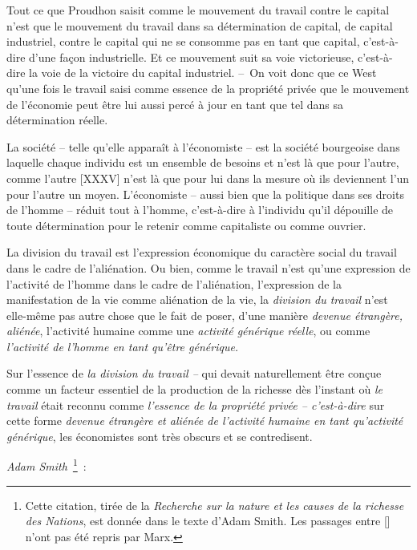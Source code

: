 \documentclass[french,twoside]{book} %
\begin{document}
Tout ce que Proudhon saisit comme le mouvement du travail contre le capital n’est que le mouvement du travail dans sa détermination de capital, de capital industriel, contre le capital qui ne se consomme pas en tant que capital, c’est-à-dire d’une façon industrielle. Et ce mouvement suit sa voie victorieuse, c’est-à-dire la voie de la victoire du capital industriel. – On voit donc que ce West qu’une fois le travail saisi comme essence de la propriété privée que le mouvement de l’économie peut être lui aussi percé à jour en tant que tel dans sa détermination réelle.\par
La société – telle qu’elle apparaît à l’économiste – est la société bourgeoise dans laquelle chaque individu est un ensemble de besoins et n’est là que pour l’autre, comme l’autre [XXXV] n’est là que pour lui dans la mesure où ils deviennent l’un pour l’autre un moyen. L’économiste – aussi bien que la politique dans ses droits de l’homme – réduit tout à l’homme, c’est-à-dire à l’individu qu’il dépouille de toute détermination pour le retenir comme capitaliste ou comme ouvrier.\par
La division du travail est l’expression économique du caractère social du travail dans le cadre de l’aliénation. Ou bien, comme le travail n’est qu’une expression de l’activité de l’homme dans le cadre de l’aliénation, l’expression de la manifestation de la vie comme aliénation de la vie, la \emph{division du travail} n’est elle-même pas autre chose que le fait de poser, d’une manière \emph{devenue étrangère, aliénée}, l’activité humaine comme une \emph{activité générique réelle}, ou comme \emph{l’activité de l’homme en tant qu’être générique.}\par
Sur l’essence de \emph{la division du travail –} qui devait naturellement être conçue comme un facteur essentiel de la production de la richesse dès l’instant où \emph{le travail} était reconnu comme \emph{l’essence de la propriété privée – c’est-à-dire} sur cette forme \emph{devenue étrangère et aliénée de l’activité humaine en tant qu’activité générique}, les économistes sont très obscurs et se contredisent.\par
\emph{Adam Smith} \footnote{Cette citation, tirée de la \emph{Recherche sur la nature et les causes de la richesse des Nations}, est donnée dans le texte d’Adam Smith. Les passages entre [] n’ont pas été repris par Marx.} :\par
\end{document}
